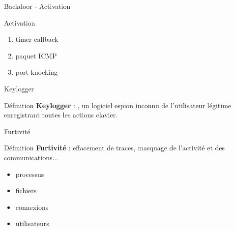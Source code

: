 \documentclass[10pt]{beamer}
\begin{document}
\begin{frame}{Backdoor - Activation}
	
    
    
	\begin{alertblock}{Activation}
		\begin{enumerate}
			\item timer callback
			\item paquet ICMP
			\item port knocking
		\end{enumerate}
    \end{alertblock}


\end{frame}

\begin{frame}{Keylogger}
	
	\begin{alertblock}{Définition}
		\textbf{Keylogger} : , un logiciel espion inconnu de l'utilisateur légitime enregistrant toutes les actions clavier.
    \end{alertblock}

\end{frame}

\begin{frame}{Furtivité}
	
	\begin{alertblock}{Définition}
		\textbf{Furtivité} : effacement de traces, masquage de l'activité et des communications...
    \end{alertblock}
	\begin{itemize}
		\item processus
		\item fichiers
		\item connexions
		\item utilisateurs
	\end{itemize}	 

\end{frame}
\end{document}
